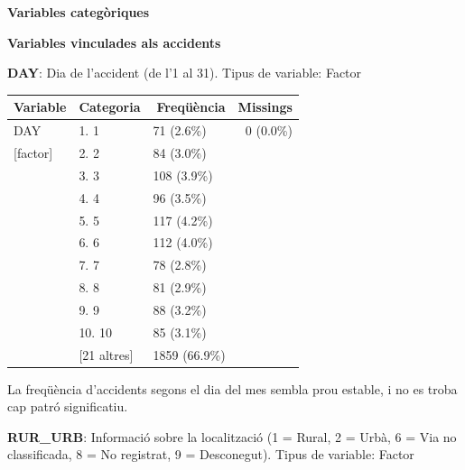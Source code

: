 \documentclass[12pt,longbibliography]{article}
\theoremstyle{definition}
\theoremstyle{remark}
\begin{document}
\begin{large}

\textbf{Variables categòriques}

\end{large}

\textbf{Variables vinculades als accidents}



\textbf{DAY}: Dia de l’accident (de l’1 al 31). Tipus de variable: Factor

\begin{table}[H]
\centering
\begin{tabular}{lllr}
\hline
Variable     & \multicolumn{1}{r}{Categoria} & \multicolumn{1}{r}{Freqüència} & Missings  \\ \hline
DAY          & 1. 1                          & 71 (2.6\%)                     & 0 (0.0\%) \\
{[}factor{]} & 2. 2                          & 84 (3.0\%)                     &           \\
             & 3. 3                          & 108 (3.9\%)                    &           \\
             & 4. 4                          & 96 (3.5\%)                     &           \\
             & 5. 5                          & 117 (4.2\%)                    &           \\
             & 6. 6                          & 112 (4.0\%)                    &           \\
             & 7. 7                          & 78 (2.8\%)                     &           \\
             & 8. 8                          & 81 (2.9\%)                     &           \\
             & 9. 9                          & 88 (3.2\%)                     &           \\
             & 10. 10                        & 85 (3.1\%)                     &           \\
             & {[}21 altres{]}               & 1859 (66.9\%)                  &           \\ \hline
\end{tabular}
\end{table}

La freqüència d'accidents segons el dia del mes sembla prou estable, i no es troba cap patró significatiu.


\textbf{RUR\_URB}: Informació sobre la localització (1 = Rural, 2 = Urbà, 6 = Via no classificada, 8 = No registrat, 9 = Desconegut). Tipus de variable: Factor
\end{document}
